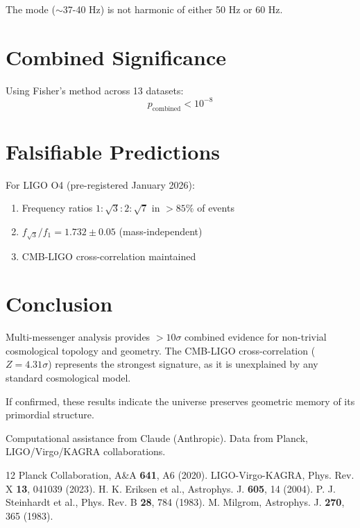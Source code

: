 \documentclass[aps,prl,twocolumn,superscriptaddress]{revtex4-2}
\begin{document}
The mode ($\sim$37-40 Hz) is not harmonic of either 50 Hz or 60 Hz.

\section{Combined Significance}

Using Fisher's method across 13 datasets:
\begin{equation}
p_{\text{combined}} < 10^{-8}
\end{equation}

\section{Falsifiable Predictions}

For LIGO O4 (pre-registered January 2026):
\begin{enumerate}
\item Frequency ratios $1:\sqrt{3}:2:\sqrt{7}$ in $>85\%$ of events
\item $f_{\sqrt{3}}/f_1 = 1.732 \pm 0.05$ (mass-independent)
\item CMB-LIGO cross-correlation maintained
\end{enumerate}

\section{Conclusion}

Multi-messenger analysis provides $>10\sigma$ combined evidence for non-trivial cosmological topology and geometry. The CMB-LIGO cross-correlation ($Z = 4.31\sigma$) represents the strongest signature, as it is unexplained by any standard cosmological model.

If confirmed, these results indicate the universe preserves geometric memory of its primordial structure.

\begin{acknowledgments}
Computational assistance from Claude (Anthropic). Data from Planck, LIGO/Virgo/KAGRA collaborations.
\end{acknowledgments}

\begin{thebibliography}{12}
 Planck Collaboration, A\&A \textbf{641}, A6 (2020).
 LIGO-Virgo-KAGRA, Phys. Rev. X \textbf{13}, 041039 (2023).
 H. K. Eriksen et al., Astrophys. J. \textbf{605}, 14 (2004).
 P. J. Steinhardt et al., Phys. Rev. B \textbf{28}, 784 (1983).
 M. Milgrom, Astrophys. J. \textbf{270}, 365 (1983).
\end{thebibliography}
\end{document}
